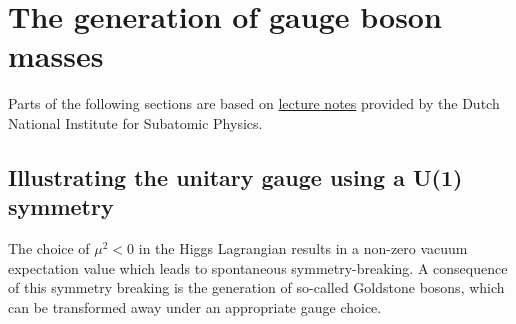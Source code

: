 \section{The generation of gauge boson masses}
 Parts of the following sections are based on \href{https://www.nikhef.nl/~ivov/HiggsLectureNote.pdf}{lecture notes} provided by the Dutch National Institute for Subatomic Physics.

\subsection{Illustrating the unitary gauge  using a U(1) symmetry}
The choice of $\mu^{2} < 0$ in the Higgs Lagrangian results in a non-zero vacuum expectation value which leads to spontaneous symmetry-breaking. %
A consequence of this symmetry breaking is the generation of so-called Goldstone bosons, which can be transformed away under an appropriate gauge choice.

